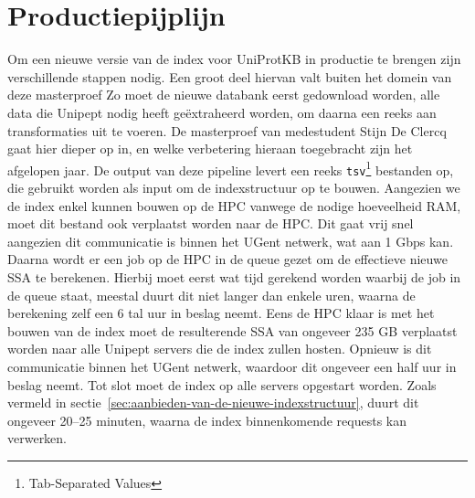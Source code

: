 \section{Productiepijplijn}
Om een nieuwe versie van de index voor UniProtKB in productie te brengen zijn verschillende stappen nodig.
Een groot deel hiervan valt buiten het domein van deze masterproef
Zo moet de nieuwe databank eerst gedownload worden, alle data die Unipept nodig heeft geëxtraheerd worden, om daarna een reeks aan transformaties uit te voeren.
De masterproef van medestudent Stijn De Clercq gaat hier dieper op in, en welke verbetering hieraan toegebracht zijn het afgelopen jaar.
De output van deze pipeline levert een reeks \texttt{tsv}\footnote{Tab-Separated Values} bestanden op, die gebruikt worden als input om de indexstructuur op te bouwen.
Aangezien we de index enkel kunnen bouwen op de HPC vanwege de nodige hoeveelheid RAM, moet dit bestand ook verplaatst worden naar de HPC\@.
Dit gaat vrij snel aangezien dit communicatie is binnen het UGent netwerk, wat aan 1 Gbps kan.
Daarna wordt er een job op de HPC in de queue gezet om de effectieve nieuwe SSA te berekenen.
Hierbij moet eerst wat tijd gerekend worden waarbij de job in de queue staat, meestal duurt dit niet langer dan enkele uren, waarna de berekening zelf een 6 tal uur in beslag neemt.
Eens de HPC klaar is met het bouwen van de index moet de resulterende SSA van ongeveer 235 GB verplaatst worden naar alle Unipept servers die de index zullen hosten.
Opnieuw is dit communicatie binnen het UGent netwerk, waardoor dit ongeveer een half uur in beslag neemt.
Tot slot moet de index op alle servers opgestart worden.
Zoals vermeld in sectie~\ref{sec:aanbieden-van-de-nieuwe-indexstructuur}, duurt dit ongeveer 20--25 minuten, waarna de index binnenkomende requests kan verwerken.
